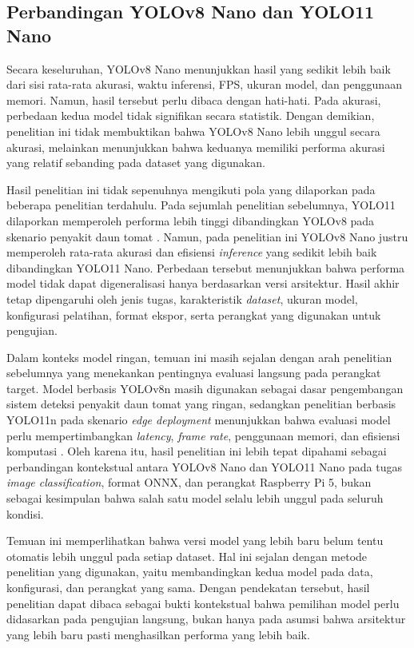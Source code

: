 \begin{sectioncontent}
    \subsection{Perbandingan YOLOv8 Nano dan YOLO11 Nano}
    \begin{subsectioncontent}
        \hspace{\parindent}Secara keseluruhan, YOLOv8 Nano menunjukkan hasil yang sedikit lebih baik dari sisi rata-rata akurasi, waktu inferensi, FPS, ukuran model, dan penggunaan memori. Namun, hasil tersebut perlu dibaca dengan hati-hati. Pada akurasi, perbedaan kedua model tidak signifikan secara statistik. Dengan demikian, penelitian ini tidak membuktikan bahwa YOLOv8 Nano lebih unggul secara akurasi, melainkan menunjukkan bahwa keduanya memiliki performa akurasi yang relatif sebanding pada dataset yang digunakan.

        Hasil penelitian ini tidak sepenuhnya mengikuti pola yang dilaporkan pada beberapa penelitian terdahulu. Pada sejumlah penelitian sebelumnya, YOLO11 dilaporkan memperoleh performa lebih tinggi dibandingkan YOLOv8 pada skenario penyakit daun tomat \citep{ramos2025comprehensive,majid2025comparative}. Namun, pada penelitian ini YOLOv8 Nano justru memperoleh rata-rata akurasi dan efisiensi \textit{inference} yang sedikit lebih baik dibandingkan YOLO11 Nano. Perbedaan tersebut menunjukkan bahwa performa model tidak dapat digeneralisasi hanya berdasarkan versi arsitektur. Hasil akhir tetap dipengaruhi oleh jenis tugas, karakteristik \textit{dataset}, ukuran model, konfigurasi pelatihan, format ekspor, serta perangkat yang digunakan untuk pengujian.

        Dalam konteks model ringan, temuan ini masih sejalan dengan arah penelitian sebelumnya yang menekankan pentingnya evaluasi langsung pada perangkat target. Model berbasis YOLOv8n masih digunakan sebagai dasar pengembangan sistem deteksi penyakit daun tomat yang ringan, sedangkan penelitian berbasis YOLO11n pada skenario \textit{edge deployment} menunjukkan bahwa evaluasi model perlu mempertimbangkan \textit{latency}, \textit{frame rate}, penggunaan memori, dan efisiensi komputasi \citep{he2025ltyolo,sun2025yoloplnet}. Oleh karena itu, hasil penelitian ini lebih tepat dipahami sebagai perbandingan kontekstual antara YOLOv8 Nano dan YOLO11 Nano pada tugas \textit{image classification}, format ONNX, dan perangkat Raspberry Pi 5, bukan sebagai kesimpulan bahwa salah satu model selalu lebih unggul pada seluruh kondisi.

        Temuan ini memperlihatkan bahwa versi model yang lebih baru belum tentu otomatis lebih unggul pada setiap dataset. Hal ini sejalan dengan metode penelitian yang digunakan, yaitu membandingkan kedua model pada data, konfigurasi, dan perangkat yang sama. Dengan pendekatan tersebut, hasil penelitian dapat dibaca sebagai bukti kontekstual bahwa pemilihan model perlu didasarkan pada pengujian langsung, bukan hanya pada asumsi bahwa arsitektur yang lebih baru pasti menghasilkan performa yang lebih baik.
    \end{subsectioncontent}


\end{sectioncontent}

